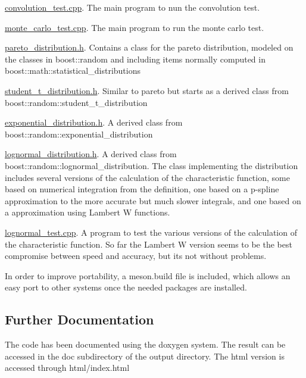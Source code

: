 \begin{DoxyItemize}
\item \mbox{\hyperlink{convolution__test_8cpp}{convolution\+\_\+test.\+cpp}}. The main program to nun the convolution test.
\item \mbox{\hyperlink{monte__carlo__test_8cpp}{monte\+\_\+carlo\+\_\+test.\+cpp}}. The main program to run the monte carlo test.
\item \mbox{\hyperlink{pareto__distribution_8h}{pareto\+\_\+distribution.\+h}}. Contains a class for the pareto distribution, modeled on the classes in boost\+::random and including items normally computed in boost\+::math\+::statistical\+\_\+distributions
\item \mbox{\hyperlink{student__t__distribution_8h}{student\+\_\+t\+\_\+distribution.\+h}}. Similar to pareto but starts as a derived class from boost\+::random\+::student\+\_\+t\+\_\+distribution
\item \mbox{\hyperlink{exponential__distribution_8h}{exponential\+\_\+distribution.\+h}}. A derived class from boost\+::random\+::exponential\+\_\+distribution
\item \mbox{\hyperlink{lognormal__distribution_8h}{lognormal\+\_\+distribution.\+h}}. A derived class from boost\+::random\+::lognormal\+\_\+distribution. The class implementing the distribution includes several versions of the calculation of the characteristic function, some based on numerical integration from the definition, one based on a p-\/spline approximation to the more accurate but much slower integrals, and one based on a approximation using Lambert W functions.
\item \mbox{\hyperlink{lognormal__test_8cpp}{lognormal\+\_\+test.\+cpp}}. A program to test the various versions of the calculation of the characteristic function. So far the Lambert W version seems to be the best compromise between speed and accuracy, but it\textquotesingle{}s not without problems.
\end{DoxyItemize}

In order to improve portability, a meson.\+build file is included, which allows an easy port to other systems once the needed packages are installed.

\subsection*{Further Documentation}

The code has been documented using the doxygen system. The result can be accessed in the doc subdirectory of the output directory. The html version is accessed through html/index.\+html

